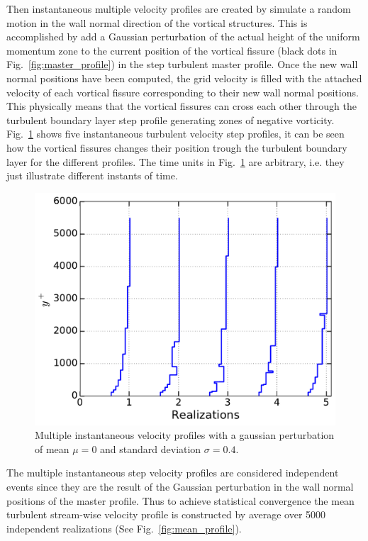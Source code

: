 \documentclass[aps,reprint,amsmath,amssymb,prl]{revtex4-1}%
\begin{document}
Then instantaneous multiple velocity profiles are created by simulate a random motion in the wall normal direction  of the vortical structures. This is accomplished by add a Gaussian perturbation of the actual height of the uniform momentum zone to the current position of the vortical fissure (black dots in Fig.~\ref{fig:master_profile}) in the step turbulent master profile. Once the new wall normal positions have been computed, the grid velocity is filled with the attached velocity of each vortical fissure corresponding to their new wall normal positions. This physically means that the vortical fissures can cross each other through the turbulent boundary layer step profile generating zones of negative vorticity. Fig.~\ref{fig:mul_profiles} shows five instantaneous turbulent velocity step profiles, it can be seen how the vortical fissures changes their position trough the turbulent boundary layer for the different profiles. The time units in Fig.~\ref{fig:mul_profiles} are arbitrary, i.e. they just illustrate different instants of time. 
\begin{figure}[b]
\includegraphics[scale=0.46]{figures/multiple_instantaneous_vprof}
\caption{\label{fig:mul_profiles} Multiple instantaneous velocity profiles with a gaussian perturbation of mean $\mu=0$ and standard deviation $\sigma=0.4$.}
\end{figure}
The multiple instantaneous step velocity profiles are considered independent events since they are the result of the Gaussian perturbation in the wall normal positions of the master profile. Thus to achieve statistical convergence the mean turbulent stream-wise velocity profile is constructed by average over 5000 independent realizations (See Fig.~\ref{fig:mean_profile}).
\end{document}
